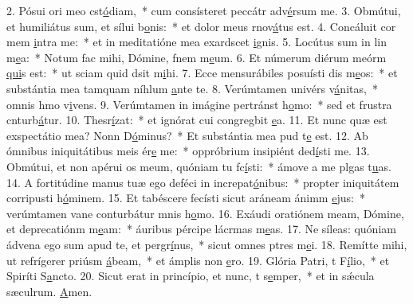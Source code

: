 2. Pósui ori meo cst\uline{ó}diam,~* cum consísteret peccátr adv\uline{é}rsum me.
3. Obmútui, et humiliátus sum, et sílui  b\uline{o}nis:~* et dolor meus rnov\uline{á}tus est.
4. Concáluit cor mem \uline{i}ntra me:~* et in meditatióne mea exardscet \uline{i}gnis.
5. Locútus sum in lin m\uline{e}a:~* Notum fac mihi, Dómine, fnem m\uline{e}um.
6. Et númerum diérum meórm \uline{qui}s est:~* ut sciam quid dsit m\uline{i}hi.
7. Ecce mensurábiles posuísti dis m\uline{e}os:~* et substántia mea tamquam níhlum \uline{a}nte te.
8. Verúmtamen univérs v\uline{á}nitas,~* omnis hmo v\uline{i}vens.
9. Verúmtamen in imágine pertránst h\uline{o}mo:~* sed et frustra cnturb\uline{á}tur.
10. Thesr\uline{í}zat:~* et ignórat cui congregbit \uline{e}a.
11. Et nunc quæ est exspectátio mea? Nonn D\uline{ó}minus?~* Et substántia mea pud t\uline{e} est.
12. Ab ómnibus iniquitátibus meis ér\uline{e} me:~* oppróbrium insipiént ded\uline{í}sti me.
13. Obmútui, et non apérui os meum, quóniam tu fc\uline{í}sti:~* ámove a me plgas t\uline{u}as.
14. A fortitúdine manus tuæ ego deféci in increpat\uline{ó}nibus:~* propter iniquitátem corripusti h\uline{ó}minem.
15. Et tabéscere fecísti sicut aráneam ánimm \uline{e}jus:~* verúmtamen vane conturbátur mnis h\uline{o}mo.
16. Exáudi oratiónem meam, Dómine, et deprecatiónm m\uline{e}am:~* áuribus pércipe lácrmas m\uline{e}as.
17. Ne síleas: quóniam ádvena ego sum apud te, et pergr\uline{í}nus,~* sicut omnes ptres m\uline{e}i.
18. Remítte mihi, ut refrígerer priúsm \uline{á}beam,~* et ámplis non \uline{e}ro.
19. Glória Patri, t F\uline{í}lio,~* et Spiríti S\uline{a}ncto.
20. Sicut erat in princípio, et nunc, t s\uline{e}mper,~* et in sǽcula sæculrum. \uline{A}men.
